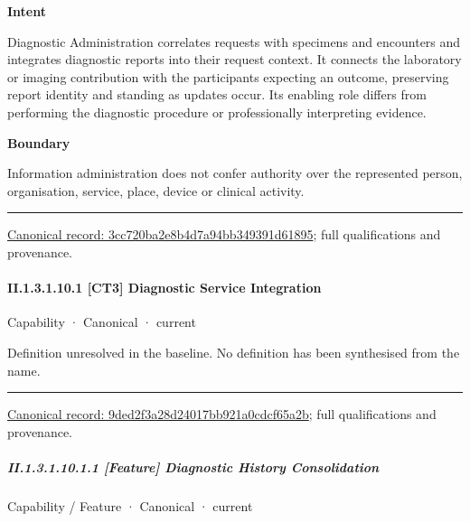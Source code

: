 \textbf{Intent}



Diagnostic Administration correlates requests with specimens and encounters and integrates diagnostic reports into their request context. It connects the laboratory or imaging contribution with the participants expecting an outcome, preserving report identity and standing as updates occur. Its enabling role differs from performing the diagnostic procedure or professionally interpreting evidence.



\textbf{Boundary}



Information administration does not confer authority over the represented person, organisation, service, place, device or clinical activity.



\medskip\hrule\medskip

{\footnotesize \href{../../../../../../../continuum/strategy/capability/3cc720ba2e8b4d7a94bb349391d61895.md}{Canonical record: 3cc720ba2e8b4d7a94bb349391d61895}; full qualifications and provenance.}\par
\paragraph*{II.1.3.1.10.1 [CT3] Diagnostic Service Integration}
\label{navigation:II.1.3.1.10.1}

\label{element:9ded2f3a28d24017bb921a0cdcf65a2b}
{\small Capability · Canonical · current}\par

Definition unresolved in the baseline. No definition has been synthesised from the name.



\medskip\hrule\medskip

{\footnotesize \href{../../../../../../../continuum/strategy/capability/9ded2f3a28d24017bb921a0cdcf65a2b.md}{Canonical record: 9ded2f3a28d24017bb921a0cdcf65a2b}; full qualifications and provenance.}\par
\subparagraph*{II.1.3.1.10.1.1 [Feature] Diagnostic History Consolidation}
\label{navigation:II.1.3.1.10.1.1}

\label{element:0b3fa0b7374842ff8ce199191a3479bd}
{\small Capability / Feature · Canonical · current}\par


